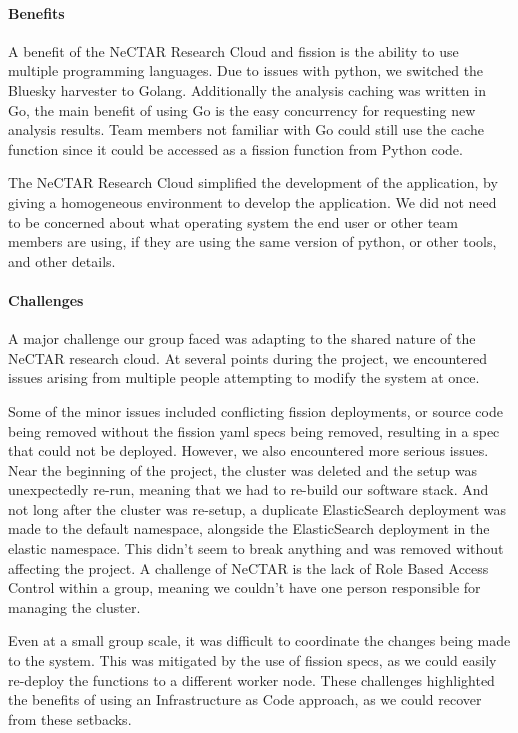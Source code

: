 \documentclass[]{article}
\numberwithin{equation}{section}
\begin{document}
\paragraph*{Benefits} A benefit of the NeCTAR Research Cloud and fission is the ability to use multiple programming languages.
Due to issues with python, we switched the Bluesky harvester to Golang.
Additionally the analysis caching was written in Go, the main benefit of using Go is the easy concurrency for requesting new analysis results.
Team members not familiar with Go could still use the cache function since it could be accessed as a fission function from Python code.

The NeCTAR Research Cloud simplified the development of the application, by giving a homogeneous environment to develop the application.
We did not need to be concerned about what operating system the end user or other team members are using, if they are using the same version of python, or other tools, and other details.

\paragraph*{Challenges} A major challenge our group faced was adapting to the shared nature of the NeCTAR research cloud.
At several points during the project, we encountered issues arising from multiple people attempting to modify the system at once.

Some of the minor issues included conflicting fission deployments, or source code being removed without the fission yaml specs being removed, resulting in a spec that could not be deployed.
However, we also encountered more serious issues.
Near the beginning of the project, the cluster was deleted and the setup was unexpectedly re-run, meaning that we had to re-build our software stack.
And not long after the cluster was re-setup, a duplicate ElasticSearch deployment was made to the default namespace, alongside the ElasticSearch deployment in the elastic namespace.
This didn't seem to break anything and was removed without affecting the project.
A challenge of NeCTAR is the lack of Role Based Access Control within a group, meaning we couldn't have one person responsible for managing the cluster.

Even at a small group scale, it was difficult to coordinate the changes being made to the system.
This was mitigated by the use of fission specs, as we could easily re-deploy the functions to a different worker node.
These challenges highlighted the benefits of using an Infrastructure as Code approach, as we could recover from these setbacks.
\end{document}
